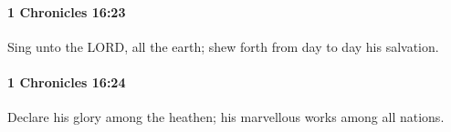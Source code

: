 		\paragraph{1 Chronicles 16:23} %
			\label{1CHRONICLES-16-23}

			Sing unto the LORD, all the earth; shew forth from day to day his salvation.


		\paragraph{1 Chronicles 16:24} %
			\label{1CHRONICLES-16-24}

			Declare his glory among the heathen; his marvellous works among all nations.


